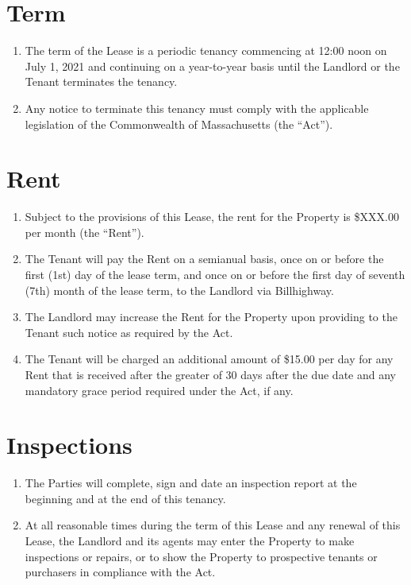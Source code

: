 \documentclass[12pt]{article}
\begin{document}
    
\section*{Term}

\begin{enumerate}[resume]
    \item The term of the Lease is a periodic tenancy commencing at 12:00 noon
	    on July 1, 2021 and continuing on a year-to-year basis until the
		Landlord or the Tenant terminates the tenancy.
   \item  Any notice to terminate this tenancy must comply with the applicable
	   legislation of the Commonwealth of Massachusetts (the ``Act'').
\end{enumerate}
   
\section*{Rent}

\begin{enumerate}[resume]
    \item Subject to the provisions of this Lease, the rent for the Property is
	    \$XXX.00 per month (the ``Rent'').
    \item The Tenant will pay the Rent on a semianual basis, once on or before
        the first (1st) day of the lease term, and once on or before the first
        day of seventh (7th) month of the lease term, to the Landlord via
		Billhighway.
    \item The Landlord may increase the Rent for the Property upon providing to
	    the Tenant such notice as required by the Act.
    \item The Tenant will be charged an additional amount of \$15.00 per day
	    for any Rent that is received after the greater of 30 days after
		the due date and any mandatory grace period required under the
		Act, if any.
\end{enumerate}
    
\section*{Inspections}

\begin{enumerate}[resume]
    \item The Parties will complete, sign and date an inspection report at the
	    beginning and at the end of this tenancy.
    \item At all reasonable times during the term of this Lease and any renewal
	    of this Lease, the Landlord and its agents may enter the Property
		to make inspections or repairs, or to show the Property to
		prospective tenants or purchasers in compliance with the Act.
\end{enumerate}
    
\end{document}
